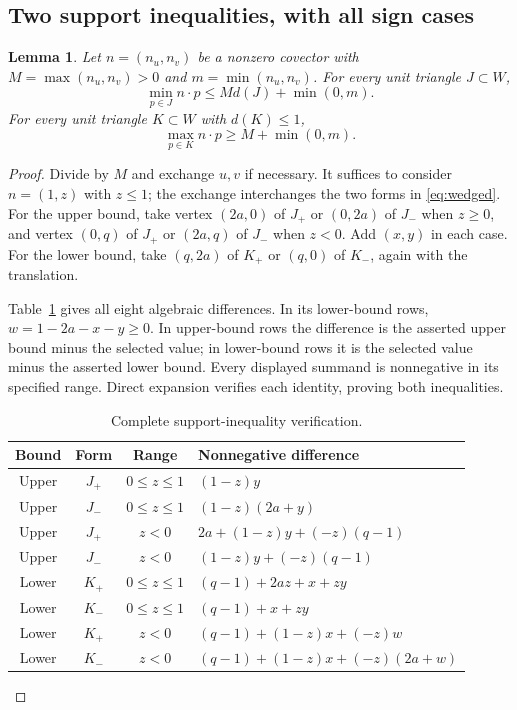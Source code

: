 \documentclass[11pt]{article}
\newtheorem{lemma}[theorem]{Lemma}
\begin{document}
\subsection{Two support inequalities, with all sign cases}

\begin{lemma}\label{lem:support}
Let $n=(n_u,n_v)$ be a nonzero covector with $M=\max(n_u,n_v)>0$ and $m=\min(n_u,n_v)$. For every unit triangle $J\subset W$,
\begin{equation}\label{eq:support-upper}
 \min_{p\in J}n\cdot p\le M d(J)+\min(0,m).
\end{equation}
For every unit triangle $K\subset W$ with $d(K)\le1$,
\begin{equation}\label{eq:support-lower}
 \max_{p\in K}n\cdot p\ge M+\min(0,m).
\end{equation}
\end{lemma}

\begin{proof}
Divide by $M$ and exchange $u,v$ if necessary. It suffices to consider $n=(1,z)$ with $z\le1$; the exchange interchanges the two forms in \eqref{eq:wedged}. For the upper bound, take vertex $(2a,0)$ of $J_+$ or $(0,2a)$ of $J_-$ when $z\ge0$, and vertex $(0,q)$ of $J_+$ or $(2a,q)$ of $J_-$ when $z<0$. Add $(x,y)$ in each case. For the lower bound, take $(q,2a)$ of $K_+$ or $(q,0)$ of $K_-$, again with the translation.

Table~\ref{tab:eight-cases} gives all eight algebraic differences. In its lower-bound rows, $w=1-2a-x-y\ge0$. In upper-bound rows the difference is the asserted upper bound minus the selected value; in lower-bound rows it is the selected value minus the asserted lower bound. Every displayed summand is nonnegative in its specified range. Direct expansion verifies each identity, proving both inequalities.
\begin{table}[htbp]
\centering
\small
\begin{tabular}{c c c l}
\hline
Bound & Form & Range & Nonnegative difference\\\hline
Upper & $J_+$ & $0\le z\le1$ & $(1-z)y$\\
Upper & $J_-$ & $0\le z\le1$ & $(1-z)(2a+y)$\\
Upper & $J_+$ & $z<0$ & $2a+(1-z)y+(-z)(q-1)$\\
Upper & $J_-$ & $z<0$ & $(1-z)y+(-z)(q-1)$\\
Lower & $K_+$ & $0\le z\le1$ & $(q-1)+2az+x+zy$\\
Lower & $K_-$ & $0\le z\le1$ & $(q-1)+x+zy$\\
Lower & $K_+$ & $z<0$ & $(q-1)+(1-z)x+(-z)w$\\
Lower & $K_-$ & $z<0$ & $(q-1)+(1-z)x+(-z)(2a+w)$\\\hline
\end{tabular}
\caption{Complete support-inequality verification.}\label{tab:eight-cases}
\end{table}
\end{proof}
\end{document}
